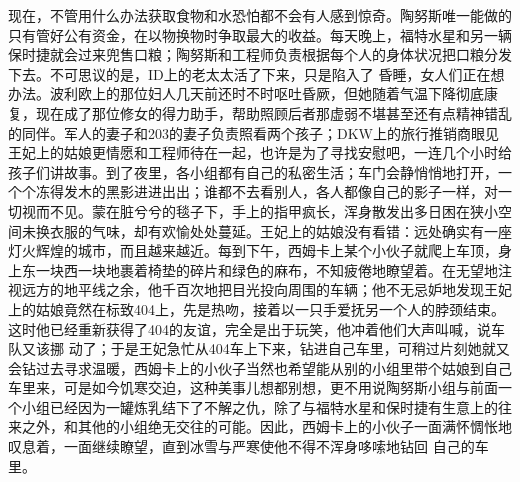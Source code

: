 \documentclass{article}
\begin{document}
现在，不管用什么办法获取食物和水恐怕都不会有人感到惊奇。陶努斯唯一能做的只有管好公有资金，在以物换物时争取最大的收益。每天晚上，福特水星和另一辆保时捷就会过来兜售口粮；陶努斯和工程师负责根据每个人的身体状况把口粮分发下去。不可思议的是，ID上的老太太活了下来，只是陷入了
\newpage
昏睡，女人们正在想办法。波利欧上的那位妇人几天前还时不时呕吐昏厥，但她随着气温下降彻底康复，现在成了那位修女的得力助手，帮助照顾后者那虚弱不堪甚至还有点精神错乱的同伴。军人的妻子和203的妻子负责照看两个孩子；DKW上的旅行推销商眼见王妃上的姑娘更情愿和工程师待在一起，也许是为了寻找安慰吧，一连几个小时给孩子们讲故事。到了夜里，各小组都有自己的私密生活；车门会静悄悄地打开，一个个冻得发木的黑影进进出出；谁都不去看别人，各人都像自己的影子一样，对一切视而不见。蒙在脏兮兮的毯子下，手上的指甲疯长，浑身散发出多日困在狭小空间未换衣服的气味，却有欢愉处处蔓延。王妃上的姑娘没有看错：远处确实有一座灯火辉煌的城市，而且越来越近。每到下午，西姆卡上某个小伙子就爬上车顶，身上东一块西一块地裹着椅垫的碎片和绿色的麻布，不知疲倦地瞭望着。在无望地注视远方的地平线之余，他千百次地把目光投向周围的车辆；他不无忌妒地发现王妃上的姑娘竟然在标致404上，先是热吻，接着以一只手爱抚另一个人的脖颈结束。这时他已经重新获得了404的友谊，完全是出于玩笑，他冲着他们大声叫喊，说车队又该挪
\newpage
动了；于是王妃急忙从404车上下来，钻进自己车里，可稍过片刻她就又会钻过去寻求温暖，西姆卡上的小伙子当然也希望能从别的小组里带个姑娘到自己车里来，可是如今饥寒交迫，这种美事儿想都别想，更不用说陶努斯小组与前面一个小组已经因为一罐炼乳结下了不解之仇，除了与福特水星和保时捷有生意上的往来之外，和其他的小组绝无交往的可能。因此，西姆卡上的小伙子一面满怀惆怅地叹息着，一面继续瞭望，直到冰雪与严寒使他不得不浑身哆嗦地钻回
自己的车里。 
\end{document}
